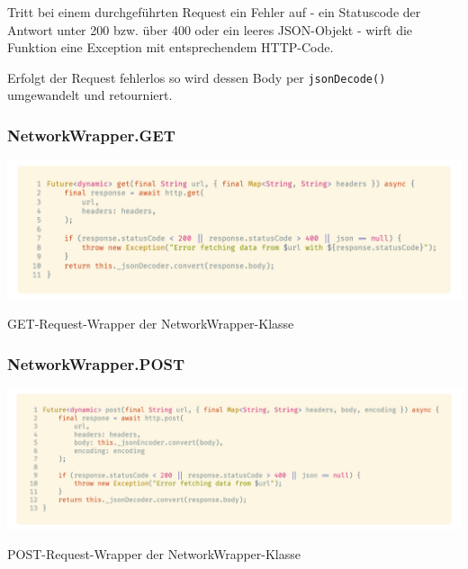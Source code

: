 Tritt bei einem durchgeführten Request ein Fehler auf - ein Statuscode der Antwort unter 200 bzw. über 400 oder ein
leeres JSON-Objekt - wirft die Funktion eine Exception mit entsprechendem HTTP-Code.

Erfolgt der Request fehlerlos so wird dessen Body per \lstinline{jsonDecode()} umgewandelt und retourniert.

\subsubsection{NetworkWrapper.GET}

\begin{code}
    \centering
    \includegraphics[width=1\textwidth]{images/Client/util/network-wrapper/networkWrapperGET.png}
    \caption{GET-Request-Wrapper der NetworkWrapper-Klasse}
\end{code}

\subsubsection{NetworkWrapper.POST}

\begin{code}
    \centering
    \includegraphics[width=1\textwidth]{images/Client/util/network-wrapper/networkWrapperPOST.png}
    \caption{POST-Request-Wrapper der NetworkWrapper-Klasse}
\end{code}